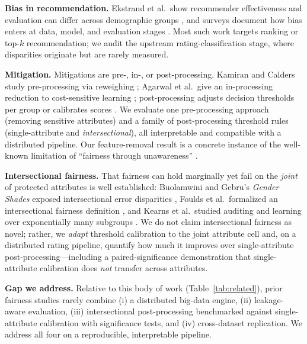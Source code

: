 \documentclass[conference]{IEEEtran}
\begin{document}
\textbf{Bias in recommendation.} Ekstrand et al.\ show recommender effectiveness and
evaluation can differ across demographic groups \cite{ekstrand2018all}, and surveys
document how bias enters at data, model, and evaluation stages
\cite{mehrabi2021survey}. Most such work targets ranking or top-$k$ recommendation;
we audit the upstream rating-classification stage, where disparities originate but
are rarely measured.

\textbf{Mitigation.} Mitigations are pre-, in-, or post-processing. Kamiran and
Calders study pre-processing via reweighing \cite{kamiran2012data}; Agarwal et al.\
give an in-processing reduction to cost-sensitive learning \cite{agarwal2018reductions};
post-processing adjusts decision thresholds per group \cite{hardt2016equality} or
calibrates scores \cite{pleiss2017calibration,corbett2017cost}. We evaluate one
pre-processing approach (removing sensitive attributes) and a family of post-processing
threshold rules (single-attribute and \emph{intersectional}), all interpretable and
compatible with a distributed pipeline. Our feature-removal result is a concrete instance
of the well-known limitation of ``fairness through unawareness'' \cite{dwork2012fairness}.

\textbf{Intersectional fairness.} That fairness can hold marginally yet fail on the
\emph{joint} of protected attributes is well established: Buolamwini and Gebru's
\emph{Gender Shades} exposed intersectional error disparities \cite{buolamwini2018gender},
Foulds et al.\ formalized an intersectional fairness definition
\cite{foulds2020intersectional}, and Kearns et al.\ studied auditing and learning over
exponentially many subgroups \cite{kearns2018gerrymandering}. We do not claim
intersectional fairness as novel; rather, we \emph{adapt} threshold calibration to the
joint attribute cell and, on a distributed rating pipeline, quantify how much it improves
over single-attribute post-processing---including a paired-significance demonstration that
single-attribute calibration does \emph{not} transfer across attributes.

\textbf{Gap we address.} Relative to this body of work (Table~\ref{tab:related}), prior
fairness studies rarely combine (i) a distributed big-data engine, (ii) leakage-aware
evaluation, (iii) intersectional post-processing benchmarked against single-attribute
calibration with significance tests, and (iv) cross-dataset replication. We address all
four on a reproducible, interpretable pipeline.
\end{document}
